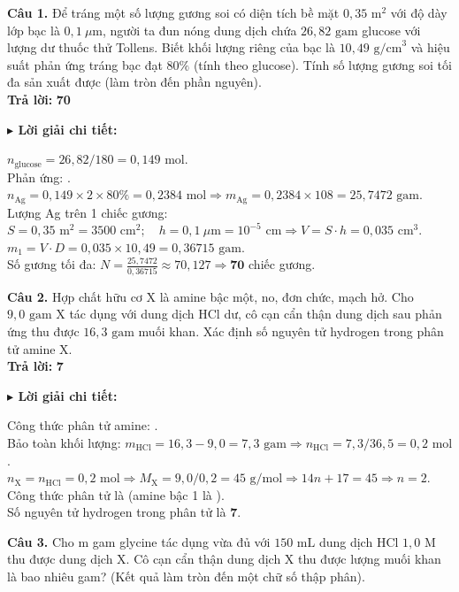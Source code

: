 \documentclass[11pt,a4paper]{article}
\newcommand{\loigiai}[1]{
    \par\vspace{2pt}
    \begingroup\leftskip=12pt
    \textcolor{solBlue}{\textbf{$\blacktriangleright$ Lời giải chi tiết:}}\par
    \small #1
    \par\endgroup\vspace{3pt}
}
\begin{document}
\textbf{Câu 1.} Để tráng một số lượng gương soi có diện tích bề mặt $0,35\text{ m}^2$ với độ dày lớp bạc là $0,1\ \mu\text{m}$, người ta đun nóng dung dịch chứa $26,82\text{ gam}$ glucose với lượng dư thuốc thử Tollens. Biết khối lượng riêng của bạc là $10,49\text{ g/cm}^3$ và hiệu suất phản ứng tráng bạc đạt $80\%$ (tính theo glucose). Tính số lượng gương soi tối đa sản xuất được (làm tròn đến phần nguyên).\\[2pt]
\textbf{Trả lời:} \textbf{\color{ansRed}70}\\[2pt]
\loigiai{$n_{\text{glucose}} = 26,82 / 180 = 0,149\text{ mol}$.\\
Phản ứng: \ce{C6H12O6 -> 2Ag}.\\
$n_{\text{Ag}} = 0,149 \times 2 \times 80\% = 0,2384\text{ mol} \Rightarrow m_{\text{Ag}} = 0,2384 \times 108 = 25,7472\text{ gam}$.\\
Lượng Ag trên 1 chiếc gương:\\
$S = 0,35\text{ m}^2 = 3500\text{ cm}^2; \quad h = 0,1\ \mu\text{m} = 10^{-5}\text{ cm} \Rightarrow V = S \cdot h = 0,035\text{ cm}^3$.\\
$m_1 = V \cdot D = 0,035 \times 10,49 = 0,36715\text{ gam}$.\\
Số gương tối đa: $N = \frac{25,7472}{0,36715} \approx 70,127 \Rightarrow \textbf{70}$ chiếc gương.}
\vspace{2pt}
\textbf{Câu 2.} Hợp chất hữu cơ X là amine bậc một, no, đơn chức, mạch hở. Cho $9,0\text{ gam}$ X tác dụng với dung dịch HCl dư, cô cạn cẩn thận dung dịch sau phản ứng thu được $16,3\text{ gam}$ muối khan. Xác định số nguyên tử hydrogen trong phân tử amine X.\\[2pt]
\textbf{Trả lời:} \textbf{\color{ansRed}7}\\[2pt]
\loigiai{Công thức phân tử amine: .\\
Bảo toàn khối lượng: $m_{\text{HCl}} = 16,3 - 9,0 = 7,3\text{ gam} \Rightarrow n_{\text{HCl}} = 7,3 / 36,5 = 0,2\text{ mol}$.\\
$n_{\text{X}} = n_{\text{HCl}} = 0,2\text{ mol} \Rightarrow M_{\text{X}} = 9,0 / 0,2 = 45\text{ g/mol} \Rightarrow 14n + 17 = 45 \Rightarrow n = 2$.\\
Công thức phân tử là \ce{C2H7N} (amine bậc 1 là \ce{C2H5NH2}).\\
Số nguyên tử hydrogen trong phân tử là \textbf{7}.}
\vspace{2pt}
\textbf{Câu 3.} Cho m gam glycine tác dụng vừa đủ với $150\text{ mL}$ dung dịch HCl $1,0\text{ M}$ thu được dung dịch X. Cô cạn cẩn thận dung dịch X thu được lượng muối khan là bao nhiêu gam? (Kết quả làm tròn đến một chữ số thập phân).\\[2pt]
\end{document}
